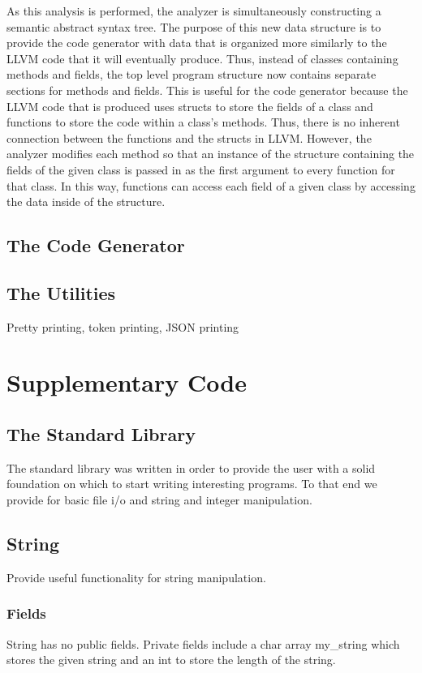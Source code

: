 \begin{homeworkProblem}
	As this analysis is performed, the analyzer is simultaneously constructing a semantic abstract syntax tree. The purpose of this new data structure is to provide the code generator with data that is organized more similarly to the LLVM code that it will eventually produce. Thus, instead of classes containing methods and fields, the top level program structure now contains separate sections for methods and fields. This is useful for the code generator because the LLVM code that is produced uses structs to store the fields of a class and functions to store the code within a class's methods. Thus, there is no inherent connection between the functions and the structs in LLVM. However, the analyzer modifies each method so that an instance of the structure containing the fields of the given class is passed in as the first argument to every function for that class. In this way, functions can access each field of a given class by accessing the data inside of the structure. 
	​
	\subsection{The Code Generator}
	\subsection{The Utilities}
	Pretty printing, token printing, JSON printing
	\section{Supplementary Code}
	\subsection{The Standard Library}
	The standard library was written in order to provide the user with a solid foundation on which to start writing interesting programs. To that end we provide for basic file i/o and string and integer manipulation.
	
	\subsection{String}
	Provide useful functionality for string manipulation.
	
	\subsubsection{Fields}
	String has no public fields. Private fields include a char array my\_string which stores the given string and an int to store the length of the string. 
	

\end{homeworkProblem}
